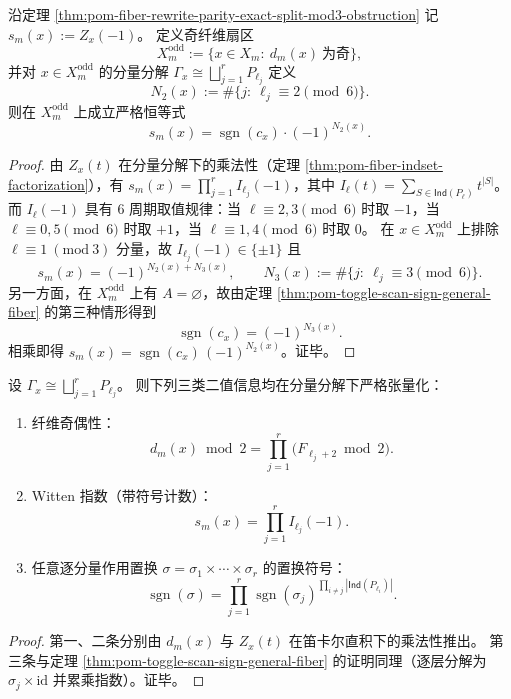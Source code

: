 \begin{proposition}\label{prop:pom-witten-index-scan-sign-coupling-odd-fiber}
沿定理 \ref{thm:pom-fiber-rewrite-parity-exact-split-mod3-obstruction} 记
\(
s_m(x):=Z_x(-1)
\)。
定义奇纤维扇区
\[
X_m^{\mathrm{odd}}:=\{x\in X_m:\ d_m(x)\ \text{为奇}\},
\]
并对 \(x\in X_m^{\mathrm{odd}}\) 的分量分解 \(\Gamma_x\cong\bigsqcup_{j=1}^r P_{\ell_j}\) 定义
\[
N_2(x):=\#\{j:\ \ell_j\equiv 2\pmod 6\}.
\]
则在 \(X_m^{\mathrm{odd}}\) 上成立严格恒等式
\[
s_m(x)=\operatorname{sgn}(c_x)\cdot (-1)^{N_2(x)}.
\]
\end{proposition}
\begin{proof}
由 \(Z_x(t)\) 在分量分解下的乘法性（定理 \ref{thm:pom-fiber-indset-factorization}），有
\(
s_m(x)=\prod_{j=1}^r I_{\ell_j}(-1)
\)，其中 \(I_\ell(t)=\sum_{S\in\mathsf{Ind}(P_\ell)}t^{|S|}\)。
而 \(I_\ell(-1)\) 具有 \(6\) 周期取值规律：当 \(\ell\equiv 2,3\pmod 6\) 时取 \(-1\)，当 \(\ell\equiv 0,5\pmod 6\) 时取 \(+1\)，当 \(\ell\equiv 1,4\pmod 6\) 时取 \(0\)。
在 \(x\in X_m^{\mathrm{odd}}\) 上排除 \(\ell\equiv 1\ (\mathrm{mod}\ 3)\) 分量，故 \(I_{\ell_j}(-1)\in\{\pm 1\}\) 且
\[
s_m(x)=(-1)^{N_2(x)+N_3(x)},
\qquad
N_3(x):=\#\{j:\ \ell_j\equiv 3\pmod 6\}.
\]
另一方面，在 \(X_m^{\mathrm{odd}}\) 上有 \(A=\varnothing\)，故由定理 \ref{thm:pom-toggle-scan-sign-general-fiber} 的第三种情形得到
\[
\operatorname{sgn}(c_x)=(-1)^{N_3(x)}.
\]
相乘即得 \(s_m(x)=\operatorname{sgn}(c_x)\,(-1)^{N_2(x)}\)。证毕。
\end{proof}

\begin{proposition}[分量并结构下的二值函子性]\label{prop:pom-binary-invariants-functoriality}
设 \(\Gamma_x\cong\bigsqcup_{j=1}^r P_{\ell_j}\)。
则下列三类二值信息均在分量分解下严格张量化：
\begin{enumerate}
\normalfont
  \item 纤维奇偶性：
  \[
  d_m(x)\bmod 2=\prod_{j=1}^r\bigl(F_{\ell_j+2}\bmod 2\bigr).
  \]
  \item Witten 指数（带符号计数）：
  \[
  s_m(x)=\prod_{j=1}^r I_{\ell_j}(-1).
  \]
  \item 任意逐分量作用置换 \(\sigma=\sigma_1\times\cdots\times\sigma_r\) 的置换符号：
  \[
  \operatorname{sgn}(\sigma)=\prod_{j=1}^r \operatorname{sgn}(\sigma_j)^{\prod_{i\ne j}|\mathsf{Ind}(P_{\ell_i})|}.
  \]
\end{enumerate}
\end{proposition}
\begin{proof}
第一、二条分别由 \(d_m(x)\) 与 \(Z_x(t)\) 在笛卡尔直积下的乘法性推出。
第三条与定理 \ref{thm:pom-toggle-scan-sign-general-fiber} 的证明同理（逐层分解为 \(\sigma_j\times \mathrm{id}\) 并累乘指数）。证毕。
\end{proof}

